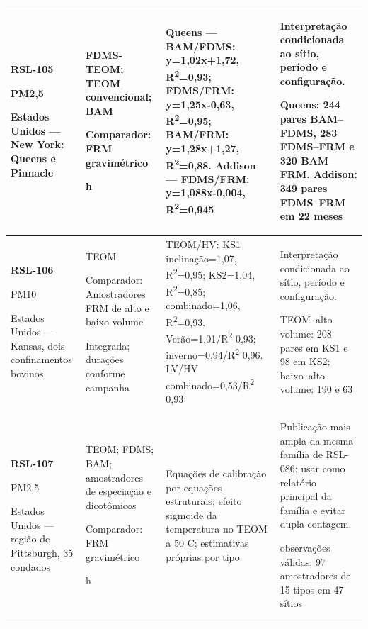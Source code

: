 \begin{longtable}{|P{0.18\textwidth}|P{0.25\textwidth}|P{0.28\textwidth}|P{\arrayrulewidth\relax}|}
\textbf{RSL-105}\par\textcite{rsl105}\par PM2,5\par Estados Unidos --- New York: Queens e Pinnacle & FDMS-TEOM; TEOM convencional; BAM\par\medskip Comparador: FRM gravimétrico\par{} h & Queens --- BAM/FDMS: y=1,02x+1,72, R\textsuperscript{2}=0,93; FDMS/FRM: y=1,25x-0,63, R\textsuperscript{2}=0,95; BAM/FRM: y=1,28x+1,27, R\textsuperscript{2}=0,88. Addison --- FDMS/FRM: y=1,088x-0,004, R\textsuperscript{2}=0,945 & Interpretação condicionada ao sítio, período e configuração.\par\medskip Queens: 244 pares BAM--FDMS, 283 FDMS--FRM e 320 BAM--FRM. Addison: 349 pares FDMS--FRM em 22 meses\\\hline
\textbf{RSL-106}\par\textcite{rsl106}\par PM10\par Estados Unidos --- Kansas, dois confinamentos bovinos & TEOM\par\medskip Comparador: Amostradores FRM de alto e baixo volume\par\medskip Integrada; durações conforme campanha & TEOM/HV: KS1 inclinação=1,07, R\textsuperscript{2}=0,95; KS2=1,04, R\textsuperscript{2}=0,85; combinado=1,06, R\textsuperscript{2}=0,93. Verão=1,01/R\textsuperscript{2} 0,93; inverno=0,94/R\textsuperscript{2} 0,96. LV/HV combinado=0,53/R\textsuperscript{2} 0,93 & Interpretação condicionada ao sítio, período e configuração.\par\medskip TEOM--alto volume: 208 pares em KS1 e 98 em KS2; baixo--alto volume: 190 e 63\\\hline
\textbf{RSL-107}\par\textcite{rsl107}\par PM2,5\par Estados Unidos --- região de Pittsburgh, 35 condados & TEOM; FDMS; BAM; amostradores de especiação e dicotômicos\par\medskip Comparador: FRM gravimétrico\par{} h & Equações de calibração por equações estruturais; efeito sigmoide da temperatura no TEOM a 50 \textdegree{}C; estimativas próprias por tipo & Publicação mais ampla da mesma família de RSL-086; usar como relatório principal da família e evitar dupla contagem.\par{} observações válidas; 97 amostradores de 15 tipos em 47 sítios\\\hline

\end{longtable}
